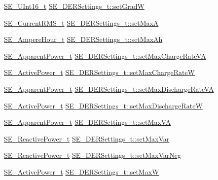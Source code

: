\begin{DoxyCompactItemize}
\item 
\hyperlink{group__UInt16_gac68d541f189538bfd30cfaa712d20d29}{S\+E\+\_\+\+U\+Int16\+\_\+t} \hyperlink{group__DERSettings_ga309dff8cb09ae5f058c2eaf57f0129b2}{S\+E\+\_\+\+D\+E\+R\+Settings\+\_\+t\+::set\+GradW}
\item 
\hyperlink{structSE__CurrentRMS__t}{S\+E\+\_\+\+Current\+R\+M\+S\+\_\+t} \hyperlink{group__DERSettings_ga2f8c9d376ed4b63d27652e879fa655b6}{S\+E\+\_\+\+D\+E\+R\+Settings\+\_\+t\+::set\+MaxA}
\item 
\hyperlink{structSE__AmpereHour__t}{S\+E\+\_\+\+Ampere\+Hour\+\_\+t} \hyperlink{group__DERSettings_ga8c5b2f3caab9dde5fbd59078af32e306}{S\+E\+\_\+\+D\+E\+R\+Settings\+\_\+t\+::set\+Max\+Ah}
\item 
\hyperlink{structSE__ApparentPower__t}{S\+E\+\_\+\+Apparent\+Power\+\_\+t} \hyperlink{group__DERSettings_gac22ce2b6b9ee46a8127b79e33a71afbb}{S\+E\+\_\+\+D\+E\+R\+Settings\+\_\+t\+::set\+Max\+Charge\+Rate\+VA}
\item 
\hyperlink{structSE__ActivePower__t}{S\+E\+\_\+\+Active\+Power\+\_\+t} \hyperlink{group__DERSettings_ga1979ec0e73dd8d0c2c689be68e90580c}{S\+E\+\_\+\+D\+E\+R\+Settings\+\_\+t\+::set\+Max\+Charge\+RateW}
\item 
\hyperlink{structSE__ApparentPower__t}{S\+E\+\_\+\+Apparent\+Power\+\_\+t} \hyperlink{group__DERSettings_ga6b44491a30152c3df1db3ae063bd1fe2}{S\+E\+\_\+\+D\+E\+R\+Settings\+\_\+t\+::set\+Max\+Discharge\+Rate\+VA}
\item 
\hyperlink{structSE__ActivePower__t}{S\+E\+\_\+\+Active\+Power\+\_\+t} \hyperlink{group__DERSettings_ga3d68c7285c446c74efb76158a8d0ec2d}{S\+E\+\_\+\+D\+E\+R\+Settings\+\_\+t\+::set\+Max\+Discharge\+RateW}
\item 
\hyperlink{structSE__ApparentPower__t}{S\+E\+\_\+\+Apparent\+Power\+\_\+t} \hyperlink{group__DERSettings_ga401a2c7fda7fbea901c15746d63877d9}{S\+E\+\_\+\+D\+E\+R\+Settings\+\_\+t\+::set\+Max\+VA}
\item 
\hyperlink{structSE__ReactivePower__t}{S\+E\+\_\+\+Reactive\+Power\+\_\+t} \hyperlink{group__DERSettings_ga40736afafc4625a920cd726bb86c889f}{S\+E\+\_\+\+D\+E\+R\+Settings\+\_\+t\+::set\+Max\+Var}
\item 
\hyperlink{structSE__ReactivePower__t}{S\+E\+\_\+\+Reactive\+Power\+\_\+t} \hyperlink{group__DERSettings_gab5d6fb6cb61c4d10e02d3717c40603a7}{S\+E\+\_\+\+D\+E\+R\+Settings\+\_\+t\+::set\+Max\+Var\+Neg}
\item 
\hyperlink{structSE__ActivePower__t}{S\+E\+\_\+\+Active\+Power\+\_\+t} \hyperlink{group__DERSettings_ga5c5d4f29bd3733e07577d46d4314705f}{S\+E\+\_\+\+D\+E\+R\+Settings\+\_\+t\+::set\+MaxW}

\end{DoxyCompactItemize}
